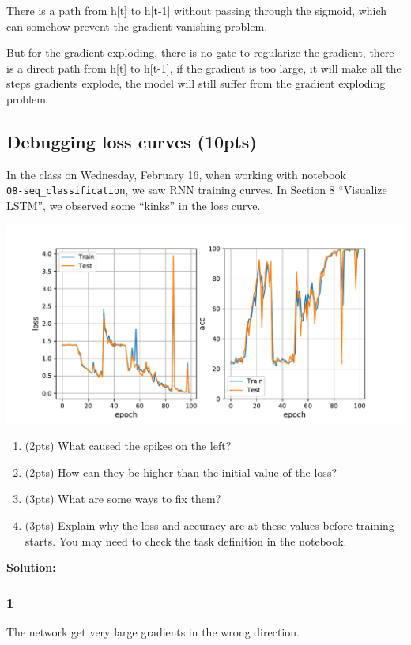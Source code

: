 There is a path from h[t] to h[t-1] without passing through the sigmoid, which can somehow prevent the gradient vanishing problem.

But for the gradient exploding, there is no gate to regularize the gradient, there is a direct path from h[t] to h[t-1], if the gradient is too large, it will make all the steps gradients explode, the model will still suffer from the gradient exploding problem.


\subsection{Debugging loss curves (10pts)}
\label{debug_loss}

In the class on Wednesday, February 16, when working with notebook \\
\texttt{08-seq\_classification}, we saw RNN training curves. In Section 8 ``Visualize LSTM'', we observed some ``kinks'' in the loss curve.

\begin{center}
\includegraphics[scale=0.5]{plots.pdf}
\end{center}

\begin{enumerate}
    \item (2pts) What caused the spikes on the left?
    \item (2pts) How can they be higher than the initial value of the loss?
    \item (3pts) What are some ways to fix them?
    \item (3pts) Explain why the loss and accuracy are at these values before training starts. You may need to check the task definition in the notebook.
\end{enumerate}

\textbf{Solution:}
\subsubsection*{1}
The network get very large gradients in the wrong direction.

